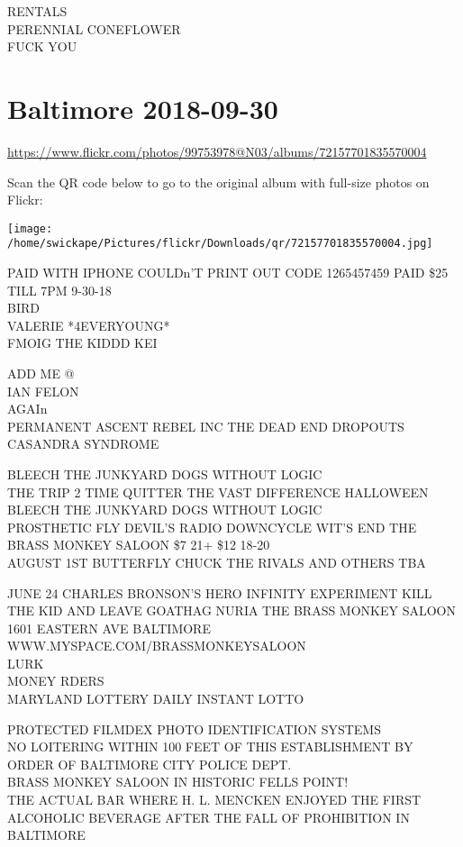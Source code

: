 \documentclass[10pt,letterpaper]{article}
\begin{document}
RENTALS\\
PERENNIAL CONEFLOWER\\
FUCK YOU


\section*{Baltimore 2018-09-30}

\url{https://www.flickr.com/photos/99753978@N03/albums/72157701835570004}

Scan the QR code below to go to the original album with full-size photos on Flickr:

\texttt{[image: /home/swickape/Pictures/flickr/Downloads/qr/72157701835570004.jpg]}


PAID WITH IPHONE COULDn'T PRINT OUT CODE 1265457459 PAID \$25 TILL 7PM 9{-}30{-}18\\
BIRD\\
VALERIE *4EVERYOUNG*\\
FMOIG THE KIDDD KEI

ADD ME @\\
IAN FELON\\
AGAIn\\
PERMANENT ASCENT REBEL INC THE DEAD END DROPOUTS CASANDRA SYNDROME

BLEECH THE JUNKYARD DOGS WITHOUT LOGIC\\
THE TRIP 2 TIME QUITTER THE VAST DIFFERENCE HALLOWEEN BLEECH THE JUNKYARD DOGS WITHOUT LOGIC\\
PROSTHETIC FLY DEVIL'S RADIO DOWNCYCLE WIT'S END THE BRASS MONKEY SALOON \$7 21+ \$12 18{-}20\\
AUGUST 1ST BUTTERFLY CHUCK THE RIVALS AND OTHERS TBA

JUNE 24 CHARLES BRONSON'S HERO INFINITY EXPERIMENT KILL THE KID AND LEAVE GOATHAG NURIA THE BRASS MONKEY SALOON 1601 EASTERN AVE BALTIMORE WWW.MYSPACE.COM/BRASSMONKEYSALOON\\
LURK\\
MONEY RDERS\\
MARYLAND LOTTERY DAILY INSTANT LOTTO

PROTECTED FILMDEX PHOTO IDENTIFICATION SYSTEMS\\
NO LOITERING WITHIN 100 FEET OF THIS ESTABLISHMENT BY ORDER OF BALTIMORE CITY POLICE DEPT.\\
BRASS MONKEY SALOON IN HISTORIC FELLS POINT!\\
THE ACTUAL BAR WHERE H. L. MENCKEN ENJOYED THE FIRST ALCOHOLIC BEVERAGE AFTER THE FALL OF PROHIBITION IN BALTIMORE
\end{document}
